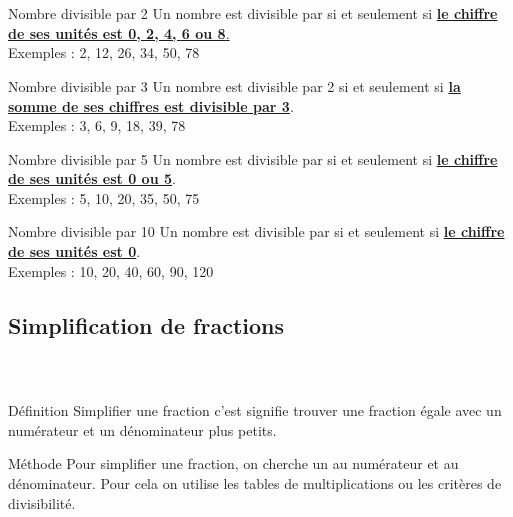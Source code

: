 \documentclass{beamer}
\begin{document}
\begin{frame}[allowframebreaks]
	\frametitle{} %
	\framesubtitle{\ }	
	
	\begin{block}{Nombre divisible par 2}
		Un nombre est divisible par  si et seulement si \underline{\textbf{le chiffre de ses unités est 0, 2, 4, 6 ou 8}.}\\
		Exemples : 2, 12, 26, 34, 50, 78 
	\end{block}
	
	\begin{block}{Nombre divisible par 3}
		Un nombre est divisible par 2 si et seulement si \textbf{\underline{la somme de ses chiffres est divisible par 3}}.\\
		Exemples : 3, 6, 9, 18, 39, 78 
	\end{block}

	\begin{block}{Nombre divisible par 5}
		Un nombre est divisible par  si et seulement si \underline{\textbf{le chiffre de ses unités est 0 ou 5}}.\\
		Exemples : 5, 10, 20, 35, 50, 75 
	\end{block}
	
	\begin{block}{Nombre divisible par 10}
		Un nombre est divisible par  si et seulement si \underline{\textbf{le chiffre de ses unités est 0}}.\\
		Exemples : 10, 20, 40, 60, 90, 120 
	\end{block}		
		
		
\end{frame}

\subsection{Simplification de fractions}

\begin{frame}
	\frametitle{} %
	\framesubtitle{\ }	
	
	\begin{block}{Définition}
		Simplifier une fraction c'est signifie trouver une fraction égale avec un numérateur et un dénominateur plus petits.
	\end{block}	
	
	\begin{block}{Méthode}
		Pour simplifier une fraction, on cherche un  au numérateur et au dénominateur. Pour cela on utilise les tables de multiplications ou les critères de divisibilité.
	\end{block}
\end{frame}
\end{document}
